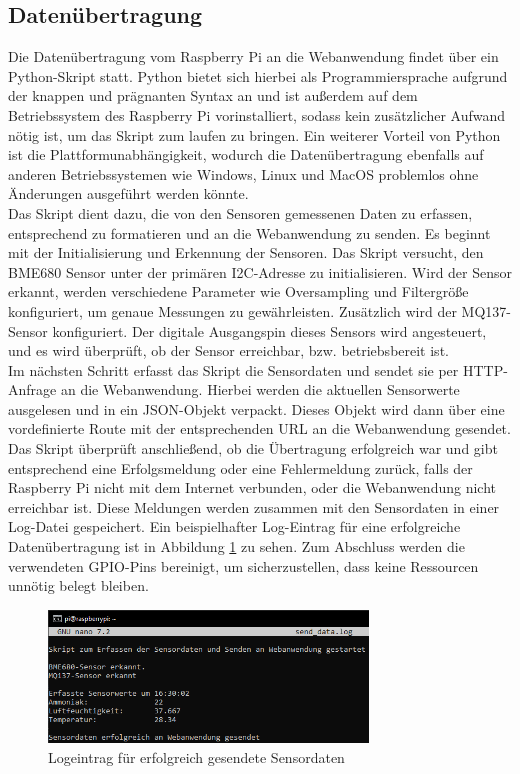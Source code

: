 \documentclass[conference]{IEEEtran}
\begin{document}
\subsection{Datenübertragung}
\label{chapter:datenuebertragung}
Die Datenübertragung vom Raspberry Pi an die Webanwendung findet über ein Python-Skript statt. Python bietet sich hierbei als Programmiersprache aufgrund der knappen und prägnanten Syntax an und ist außerdem auf dem Betriebssystem des Raspberry Pi vorinstalliert, sodass kein zusätzlicher Aufwand nötig ist, um das Skript zum laufen zu bringen. Ein weiterer Vorteil von Python ist die Plattformunabhängigkeit, wodurch die Datenübertragung ebenfalls auf anderen Betriebssystemen wie Windows, Linux und MacOS problemlos ohne Änderungen ausgeführt werden könnte. \\
Das Skript dient dazu, die von den Sensoren gemessenen Daten zu erfassen, entsprechend zu formatieren und an die Webanwendung zu senden. Es beginnt mit der Initialisierung und Erkennung der Sensoren. Das Skript versucht, den BME680 Sensor unter der primären I2C-Adresse zu initialisieren. Wird der Sensor erkannt, werden verschiedene Parameter wie Oversampling und Filtergröße konfiguriert, um genaue Messungen zu gewährleisten. Zusätzlich wird der MQ137-Sensor konfiguriert. Der digitale Ausgangspin dieses Sensors wird angesteuert, und es wird überprüft, ob der Sensor erreichbar, bzw. betriebsbereit ist. \\
Im nächsten Schritt erfasst das Skript die Sensordaten und sendet sie per HTTP-Anfrage an die Webanwendung. Hierbei werden die aktuellen Sensorwerte ausgelesen und in ein JSON-Objekt verpackt. Dieses Objekt wird dann über eine vordefinierte Route mit der entsprechenden URL an die Webanwendung gesendet. Das Skript überprüft anschließend, ob die Übertragung erfolgreich war und gibt entsprechend eine Erfolgsmeldung oder eine Fehlermeldung zurück, falls der Raspberry Pi nicht mit dem Internet verbunden, oder die Webanwendung nicht erreichbar ist. Diese Meldungen werden zusammen mit den Sensordaten in einer Log-Datei gespeichert. Ein beispielhafter Log-Eintrag für eine erfolgreiche Datenübertragung ist in Abbildung \ref{send_data_success} zu sehen. Zum Abschluss werden die verwendeten GPIO-Pins bereinigt, um sicherzustellen, dass keine Ressourcen unnötig belegt bleiben.
\begin{figure}[H]
	\centering
	\includegraphics[width=85mm]{fig/daten_erfolgreich_gesendet.png}
	\caption{Logeintrag für erfolgreich gesendete Sensordaten}
	\label{send_data_success}
\end{figure}
\end{document}

